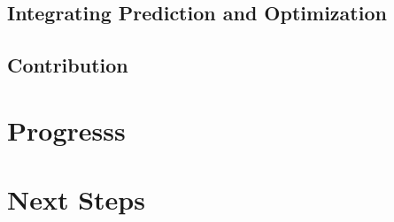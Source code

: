 \documentclass[12pt]{article}
\begin{document}
\subsection{Integrating Prediction and Optimization}
\subsection{Contribution}

\section{Progresss}

\section{Next Steps}

\newpage

  


\end{document}

